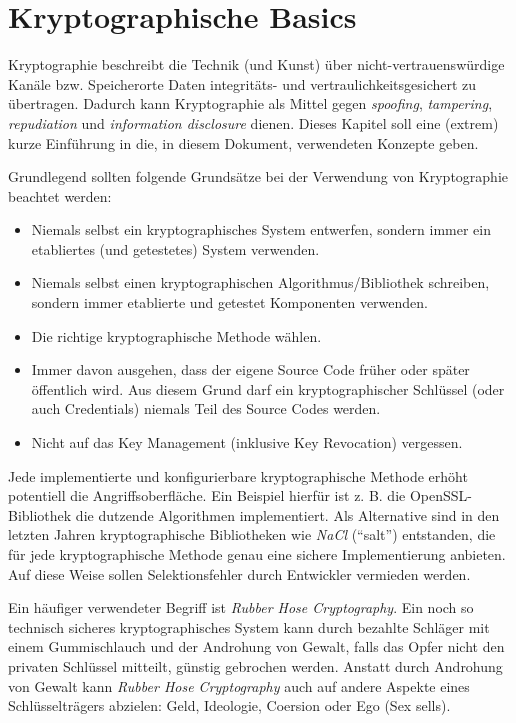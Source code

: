 \chapter{Kryptographische Basics}

Kryptographie beschreibt die Technik (und Kunst) über nicht-vertrauenswürdige Kanäle bzw. Speicherorte Daten integritäts- und vertraulichkeitsgesichert zu übertragen. Dadurch kann Kryptographie als Mittel gegen \textit{spoofing}, \textit{tampering}, \textit{repudiation} und \textit{information disclosure} dienen. Dieses Kapitel soll eine (extrem) kurze Einführung in die, in diesem Dokument, verwendeten Konzepte geben.

Grundlegend sollten folgende Grundsätze bei der Verwendung von Kryptographie beachtet werden:

\begin{itemize}
	\item Niemals selbst ein kryptographisches System entwerfen, sondern immer ein etabliertes (und getestetes) System verwenden.
	\item Niemals selbst einen kryptographischen Algorithmus/Bibliothek schreiben, sondern immer etablierte und getestet Komponenten verwenden.
	\item Die richtige kryptographische Methode wählen.
	\item Immer davon ausgehen, dass der eigene Source Code früher oder später öffentlich wird. Aus diesem Grund darf ein kryptographischer Schlüssel (oder auch Credentials) niemals Teil des Source Codes werden.
	\item Nicht auf das Key Management (inklusive Key Revocation) vergessen.
\end{itemize}

Jede implementierte und konfigurierbare kryptographische Methode erhöht potentiell die Angriffsoberfläche. Ein Beispiel hierfür ist z. B. die OpenSSL-Bibliothek die dutzende Algorithmen implementiert. Als Alternative sind in den letzten Jahren kryptographische Bibliotheken wie \textit{NaCl} (``salt'') entstanden, die für jede kryptographische Methode genau eine sichere Implementierung anbieten. Auf diese Weise sollen Selektionsfehler durch Entwickler vermieden werden.

Ein häufiger verwendeter Begriff ist \textit{Rubber Hose Cryptography}. Ein noch so technisch sicheres kryptographisches System kann durch bezahlte Schläger mit einem Gummischlauch und der Androhung von Gewalt, falls das Opfer nicht den privaten Schlüssel mitteilt, günstig gebrochen werden. Anstatt durch Androhung von Gewalt kann \textit{Rubber Hose Cryptography} auch auf andere Aspekte eines Schlüsselträgers abzielen: Geld, Ideologie, Coersion oder Ego (Sex sells).

